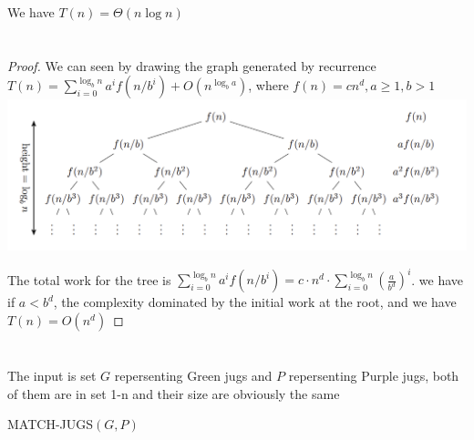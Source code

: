 \documentclass[a4paper]{article}
\begin{document}
We have $T(n)=\Theta\left(n \log n\right)$

\section{}
\begin{proof}
  We can seen by drawing the graph generated by recurrence $T(n)=\sum_{i=0}^{\log _b n} a^i f\left(n / b^i\right)+O\left(n^{\log _b a}\right)$, where $f(n)=cn^d, a\geq 1, b>1$
  \\
  \includegraphics[width=\textwidth]{test.png}

  The total work for the tree is $\sum_{i=0}^{\log _b n} a^i f\left(n / b^i\right)=c\cdot n^d \cdot \sum_{i=0}^{\log _b n} (\frac a{b^d})^i$. we have if $a<b^d$, the complexity dominated by the initial work at the root, and we have $T(n)=O(n^d)$
\end{proof}

\section{}

\subsection{}

The input is set $G$ repersenting Green jugs and $P$ repersenting Purple jugs, both of them are in set 1-n and their size are obviously the same 
\begin{algorithm}
  \caption{MATCH-JUGS$(G,P)$}\label{alg:cap3}
  \begin{algorithmic}[1]
    \EndIf
    \Else
    \State{$G_{smaller}=$ the set of smaller jugs than $g$ in G
    \State{$G_{larger}=$ the set of larger jugs than $g$ in G
    \State{$p=$ find\_if(P.begin(),P.end(),[](jug a)\{return a.water==g;\})}

    \State{$P_{smaller}=$ the set of smaller jugs than $p$ in P
    \State{$P_{larger}=$ the set of larger jugs than $p$ in P
    \State{MATCH-JUGS$(G_{smaller},P_{smaller})$}
    \State{MATCH-JUGS$(G_{larger},P_{larger})$}
    \EndIf
  \end{algorithmic}
\end{algorithm}
\end{document}
